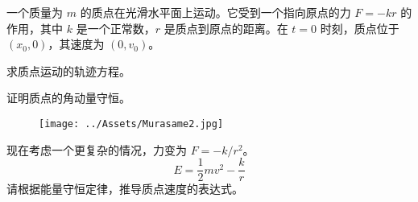 \subproblem[(1)]
一个质量为 $m$ 的质点在光滑水平面上运动。它受到一个指向原点的力 $F = -kr$ 的作用，其中 $k$ 是一个正常数，$r$ 是质点到原点的距离。在 $t=0$ 时刻，质点位于 $(x_0, 0)$，其速度为 $(0, v_0)$。

\subsubproblem[(1.1)]
求质点运动的轨迹方程。

\subsubproblem[(1.2)]
证明质点的角动量守恒。

\begin{figure}[H]
\centering
\texttt{[image: ../Assets/Murasame2.jpg]}
\label{fig:prob1}
\end{figure}

\subproblem[(2)]
现在考虑一个更复杂的情况，力变为 $F = -k/r^2$。
\begin{equation}
E = \frac{1}{2}m v^2 - \frac{k}{r}
\label{eq:energy}
\end{equation}
请根据能量守恒定律，推导质点速度的表达式。
